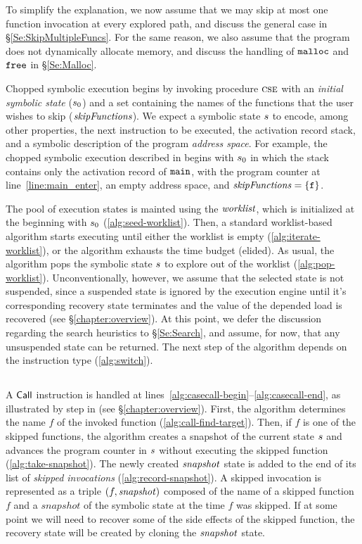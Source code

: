 To simplify the explanation, we now
assume that we may skip at most one function invocation at every
explored path, and discuss the general case in
\S\ref{Se:SkipMultipleFuncs}. For the same reason, we also assume that
the program does not dynamically allocate memory, and discuss the
handling of $\texttt{malloc}$ and $\texttt{free}$ in \S\ref{Se:Malloc}.

Chopped symbolic execution begins by invoking procedure $\textsc{cse}$
with an \emph{initial symbolic state} ($s_0$) and a set
containing the names of the functions that the user wishes to skip
($\mathit{skipFunctions}$). We expect a symbolic state $s$ to encode,
among other properties, the next instruction to be executed, the activation record stack,
and a symbolic description of the program \emph{address space}. For example, the
chopped symbolic execution described in  begins
with $s_0$ in which the stack contains only the activation record
of $\texttt{main}$, with the program counter at
line~\ref{line:main_enter}, an empty address space, and
$\mathit{skipFunctions} = \{ \texttt{f} \}$.

The pool of execution states is mainted using the $\mathit{worklist}$,
which is initialized at the beginning with $s_0$ (\cref{alg:seed-worklist}).
Then, a standard worklist-based algorithm starts executing until either the
worklist is empty (\cref{alg:iterate-worklist}), or the algorithm
exhausts the time budget (elided). As usual, the algorithm pops the
symbolic state $s$ to explore out of the worklist
(\cref{alg:pop-worklist}).
Unconventionally, however, we assume that
the selected state is not suspended, since a suspended state is ignored by the execution engine
until it's corresponding recovery state terminates
and the value of the depended load is recovered (see \S\ref{chapter:overview}).
At this point, we defer the discussion regarding the search heuristics to \S\ref{Se:Search},
and assume, for now, that any unsuspended state can be returned.
The next step of the algorithm depends on the instruction type (\cref{alg:switch}).

\subsection{}
A $\mathsf{Call}$ instruction is handled at lines~\ref{alg:casecall-begin}--\ref{alg:casecall-end},
as illustrated by step  in  (see \S\ref{chapter:overview}).
First, the algorithm determines the name $f$ of the invoked function
(\cref{alg:call-find-target}). Then, if $f$ is one of the skipped
functions, the algorithm creates a snapshot of the current state
$s$ and advances the program counter in $s$
without executing the skipped function (\cref{alg:take-snapshot}).
The newly created $\mathit{snapshot}$ state is added to the end of its list 
of \emph{skipped invocations} (\cref{alg:record-snapshot}).
A skipped invocation is represented
as a triple $(f,\mathit{snapshot})$ composed of the name of a skipped
function $f$ and a $snapshot$ of the symbolic state at the time $f$ was skipped.
If at some point we will need to recover some of the side effects
of the skipped function, the recovery state will be created
by cloning the $\mathit{snapshot}$ state.

